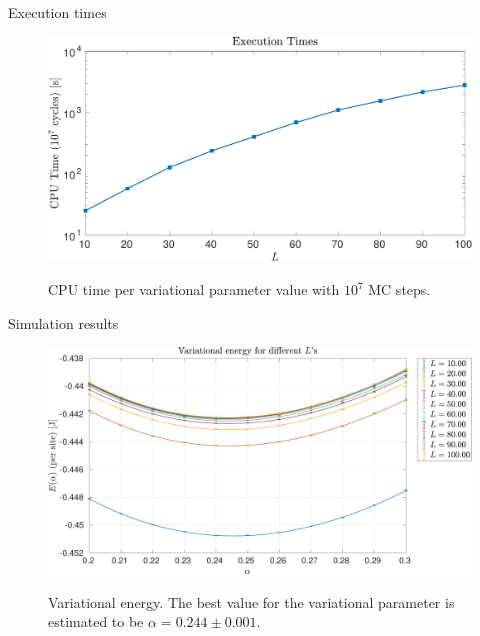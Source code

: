 \documentclass[10pt, compress, protectframetitle, handout]{beamer}
\begin{document}
\begin{frame}{Execution times}

	\begin{figure}
		\centering
		\includegraphics[width=\textwidth]{cputimes}
		\label{fig:cputimes}
		\caption{CPU time per variational parameter value with $10^7$ MC steps.}
	\end{figure}
	
\end{frame}

\begin{frame}{Simulation results}

	\begin{figure}
		\centering
		\includegraphics[width=\textwidth]{VariationalEnergies}
		\label{fig:VariationalEnergies}
		\caption{Variational energy. The best value for the variational parameter is estimated to be $\alpha = 0.244 \pm 0.001$.}
	\end{figure}
	
\end{frame}
\end{document}
